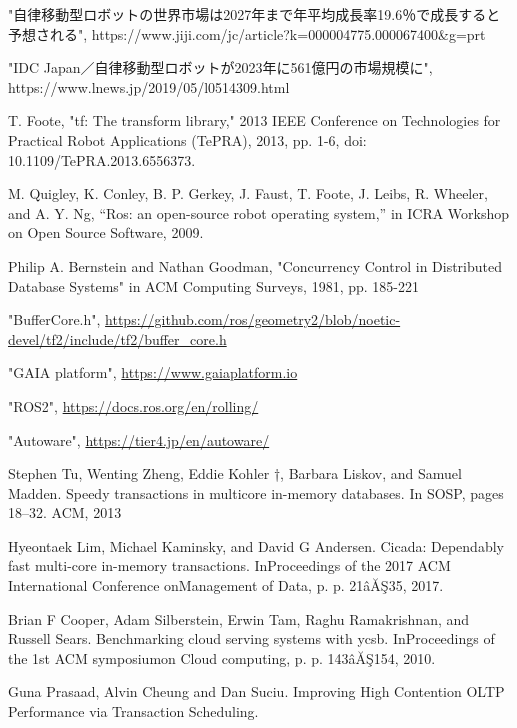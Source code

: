 \documentclass[a4paper]{jreport}	%
\begin{document}
\newpage
{}
\renewcommand{\bibname}{参考文献}


%
%

	
\begin{thebibliography}{99}

 "自律移動型ロボットの世界市場は2027年まで年平均成長率19.6％で成長すると予想される", https://www.jiji.com/jc/article?k=000004775.000067400\&g=prt

 "IDC Japan／自律移動型ロボットが2023年に561億円の市場規模に", https://www.lnews.jp/2019/05/l0514309.html

 T. Foote, "tf: The transform library," 2013 IEEE Conference on Technologies for Practical Robot Applications (TePRA), 2013, pp. 1-6, doi: 10.1109/TePRA.2013.6556373.

 M. Quigley, K. Conley, B. P. Gerkey, J. Faust, T. Foote, J. Leibs, R. Wheeler, and A. Y. Ng, “Ros: an open-source robot operating system,” in ICRA Workshop on Open Source Software, 2009.

 Philip A. Bernstein and Nathan Goodman, "Concurrency Control in Distributed Database Systems" in ACM Computing Surveys, 1981, pp. 185-221

 "BufferCore.h", \url{https://github.com/ros/geometry2/blob/noetic-devel/tf2/include/tf2/buffer_core.h}

 "GAIA platform", \url{https://www.gaiaplatform.io}

 "ROS2", \url{https://docs.ros.org/en/rolling/}

 "Autoware", \url{https://tier4.jp/en/autoware/}

 Stephen Tu, Wenting Zheng, Eddie Kohler †, Barbara Liskov,
and Samuel Madden. Speedy transactions in multicore in-memory
databases. In SOSP, pages 18–32. ACM, 2013

 Hyeontaek Lim, Michael Kaminsky, and David G Andersen. Cicada: Dependably fast multi-core in-memory transactions. InProceedings of the 2017 ACM International Conference onManagement of Data, p. p. 21âĂŞ35, 2017.

 Brian F Cooper, Adam Silberstein, Erwin Tam, Raghu Ramakrishnan, and Russell Sears. Benchmarking cloud serving systems with ycsb. InProceedings of the 1st ACM symposiumon Cloud computing, p. p. 143âĂŞ154, 2010.

 Guna Prasaad, Alvin Cheung and Dan Suciu. Improving High Contention OLTP Performance via Transaction Scheduling. 


\end{thebibliography}
\end{document}
